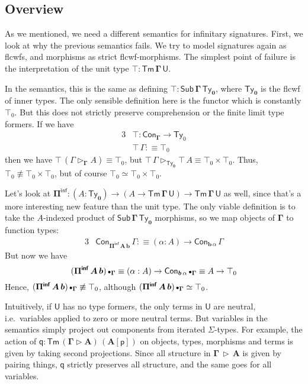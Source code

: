\documentclass[12pt,a4paper,twoside,openany]{book}
\theoremstyle{remark}
\theoremstyle{definition}
\theoremstyle{theorem}
\newcommand{\bs}[1]{\boldsymbol{#1}}
\newcommand{\Con}{\mathsf{Con}}
\newcommand{\Sub}{\mathsf{Sub}}
\newcommand{\Tm}{\mathsf{Tm}}
\newcommand{\Ty}{\mathsf{Ty}}
\newcommand{\U}{\mathsf{U}}
\newcommand{\ext}{\triangleright}
\newcommand{\emptycon}{\scaleobj{.75}\bullet}
\newcommand{\Piinf}{\Pi^{\mathsf{inf}}}
\newcommand{\p}{\mathsf{p}}
\newcommand{\q}{\mathsf{q}}
\newcommand{\bGamma}{\bs{\Gamma}}
\newcommand{\bb}{\bs{b}}
\newcommand{\bU}{\bs{\U}}
\newcommand{\defn}{:\equiv}
\begin{document}
\subsection{Overview}

As we mentioned, we need a different semantics for infinitary signatures.
First, we look at why the previous semantics fails. We try to model signatures
again as flcwfs, and morphisms as strict flcwf-morphisms. The simplest point of
failure is the interpretation of the unit type $\bs{\top : \Tm\,\Gamma\,\U}$.

In the semantics, this is the same as defining $\bs{\top :
  \Sub\,\Gamma\,\Ty_0}$, where $\bs{\Ty_0}$ is the flcwf of inner types. The
only sensible definition here is the functor which is constantly $\top_0$. But
this does not strictly preserve comprehension or the finite limit type formers.
If we have
\begin{alignat*}{3}
  &\bs{\top} : \Con_{\bGamma} \to \Ty_0\\
  &\bs{\top}\,\Gamma \defn \top_0
\end{alignat*}
then we have $\bs{\top}\,(\Gamma \ext_{\bGamma} A) \equiv \top_0$, but
$\bs{\top}\,\Gamma \ext_{\bs{\Ty_0}} \bs{\top}\,A \equiv \top_0 \times \top_0$.
Thus, $\top_0 \not\equiv \top_0 \times \top_0$, but of course $\top_0 \simeq
\top_0 \times \top_0$.

Let's look at $\bs{\Piinf} : (A : \bs{\Ty_0}) \to (A \to \bs{\Tm\,\Gamma\,\U}) \to
\bs{\Tm\,\Gamma\,\U}$ as well, since that's a more interesting new feature than the
unit type. The only viable definition is to take the $A$-indexed product of
$\bs{\Sub\,\Gamma\,\Ty_0}$ morphisms, so we map objects of $\bGamma$ to function types:
\begin{alignat*}{3}
  &\Con_{\bs{\Piinf\,A\,b}}\,\Gamma \defn (\alpha : A) \to \Con_{\bb\,\alpha}\,\Gamma
\end{alignat*}
But now we have
\[(\bs{\Piinf\,A\,b})\,\emptycon_{\bGamma} \equiv (\alpha : A) \to \Con_{\bb\,\alpha}\,\emptycon_{\bGamma}
   \equiv A \to \top_0\]
Hence, $(\bs{\Piinf\,A\,b})\,\emptycon_{\bGamma} \not\equiv \top_0$, although
$(\bs{\Piinf\,A\,b})\,\emptycon_{\bGamma} \simeq \top_0$.

Intuitively, if $\bU$ has no type formers, the only terms in $\bU$ are neutral,
i.e.\ variables applied to zero or more neutral terms. But variables in the
semantics simply project out components from iterated $\Sigma$-types. For
example, the action of $\bs{\q} : \bs{\Tm\,(\Gamma \ext A)\,(A[\p])}$ on
objects, types, morphisms and terms is given by taking second
projections. Since all structure in $\bs{\Gamma\,\ext\,A}$ is given by pairing
things, $\bs{\q}$ strictly preserves all structure, and the same goes
for all variables.
\end{document}
